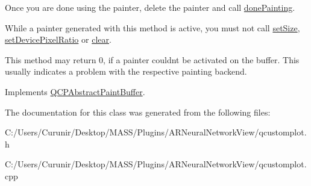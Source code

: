 Once you are done using the painter, delete the painter and call \hyperlink{class_q_c_p_abstract_paint_buffer_a41b0dc6e7744f19fae09f8532c207dc1}{done\+Painting}.

While a painter generated with this method is active, you must not call \hyperlink{class_q_c_p_abstract_paint_buffer_a8b68c3cd36533f1a4a23b5ce8cd66f01}{set\+Size}, \hyperlink{class_q_c_p_abstract_paint_buffer_a555eaad5d5c806420ff35602a1bb68fa}{set\+Device\+Pixel\+Ratio} or \hyperlink{class_q_c_p_paint_buffer_pixmap_a14badbd010a3cde6b55817ccb7b65217}{clear}.

This method may return 0, if a painter couldn\textquotesingle{}t be activated on the buffer. This usually indicates a problem with the respective painting backend. 

Implements \hyperlink{class_q_c_p_abstract_paint_buffer_a9e9f29b19c033cf02fb96f1a148463f3}{Q\+C\+P\+Abstract\+Paint\+Buffer}.



The documentation for this class was generated from the following files\+:\begin{DoxyCompactItemize}
\item 
C\+:/\+Users/\+Curunir/\+Desktop/\+M\+A\+S\+S/\+Plugins/\+A\+R\+Neural\+Network\+View/qcustomplot.\+h\item 
C\+:/\+Users/\+Curunir/\+Desktop/\+M\+A\+S\+S/\+Plugins/\+A\+R\+Neural\+Network\+View/qcustomplot.\+cpp\end{DoxyCompactItemize}
